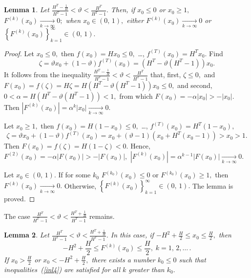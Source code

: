\documentclass[12pt,a4paper]{amsart}
\newtheorem{lemma}{Lemma}
\begin{document}
\begin{lemma}\label{l3}
Let $\frac{H^T-\frac{1}{H}}{H^T-1}<\vartheta<\frac{H^T}{H^T-1}.$ Then, if $x_0\leq 0$ or $x_0\geq 1,$ 
${F^{(k)}(x_0)\xrightarrow[k\rightarrow\infty]{}0;}$ when $x_0\in(0,\,1),$ either $F^{(k)}(x_0)\xrightarrow[k\rightarrow\infty]{}0$
or $\left\{F^{(k)}(x_0)\right\}_{k=1}^{\infty}\in(0,\,1).$
\end{lemma}

\begin{proof}
Let $x_0\leq 0,$ then $f(x_0)=Hx_0\leq 0,$ \ldots, $f^{(T)}(x_0)=H^T x_0.$ Find 
$$
\zeta=\vartheta x_0 + (1-\vartheta)f^{(T)}(x_0)=\left(H^T - \vartheta (H^T - 1)\right)x_0.
$$
It follows from the inequality $\frac{H^T-\frac{1}{H}}{H^T-1}<\vartheta<\frac{H^T}{H^T-1}$ that, first, $\zeta\leq 0,$ 
and $F(x_0)=f(\zeta)=H\zeta=H\left(H^T - \vartheta (H^T - 1)\right)x_0\leq 0,$ and second, 
$0<\alpha = H\left(H^T - \vartheta (H^T - 1)\right)<1,$ from which $F(x_0)=-\alpha|x_0|>-|x_0|.$ Then 
$\left|F^{(k)}(x_0)\right|=\alpha^k |x_0|\xrightarrow[k\rightarrow\infty]{}0.$

Let $x_0\geq 1,$ then $f(x_0)=H(1-x_0)\leq 0,$ \ldots, $f^{(T)}(x_0)=H^T (1-x_0),$
$$
\zeta=\vartheta x_0 + (1-\vartheta)f^{(T)}(x_0)=x_0+(\vartheta-1)\left(x_0 + H^T (x_0-1)\right)>x_0>1.
$$
Then $F(x_0)=f(\zeta)=H(1-\zeta) < 0.$ Hence, $F^{(2)}(x_0)=-\alpha\left|F(x_0)\right|>-\left|F(x_0)\right|,$
$\left|F^{(k)}(x_0)\right|=\alpha^{k-1} \left|F(x_0)\right| \xrightarrow[k\rightarrow\infty]{}0.$

Let $x_0\in(0,\,1).$ If for some $k_0$ $F^{(k_0)}(x_0)\leq 0$ or $F^{(k_0)}(x_0)\geq 1,$ then 
$F^{(k)}(x_0)\xrightarrow[k\rightarrow\infty]{}0.$ Otherwise, $\left\{F^{(k)}(x_0)\right\}_{k=1}^{\infty}\in(0,\,1).$
The lemma is proved. 
\end{proof}

The case $\frac{H^T}{H^T-1}<\vartheta<\frac{H^T+\frac{1}{H}}{H^T-1}$ remains.

\begin{lemma}\label{l4}
Let $\frac{H^T}{H^T-1}<\vartheta<\frac{H^T+\frac{1}{H}}{H^T-1}.$ In this case, if $-H^2+\frac{H}{2}\leq x_0 \leq \frac{H}{2},$ 
then
\begin{equation}\label{inl4}
-H^2+\frac{H}{2}\leq F^{(k)}(x_0) \leq \frac{H}{2},\;k=1,\,2,\ldots\,.
\end{equation}
If $x_0>\frac{H}{2}$ or $x_0<-H^2+\frac{H}{2},$ there exists a number $k_0\leq 0$ such that inequalities~(\ref{inl4}) are satisfied 
for all $k$ greater than $k_0.$ 
\end{lemma}
\end{document}
